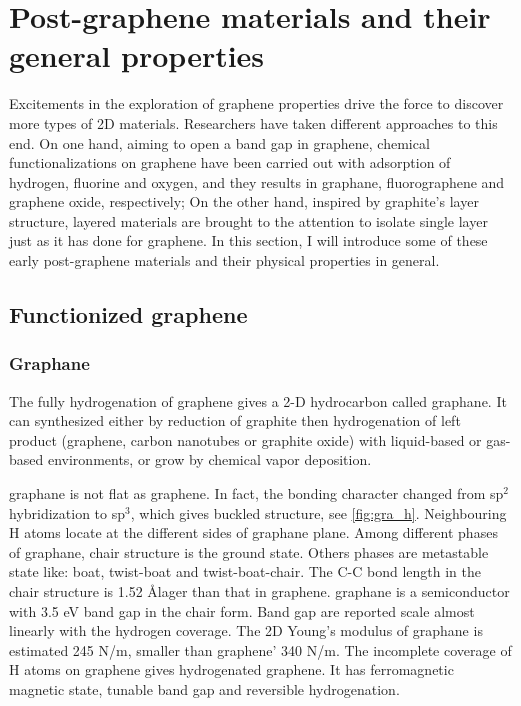 \section{Post-graphene materials and their general properties}

Excitements in the exploration of graphene properties drive the force to discover more types of 2D materials. Researchers have taken different approaches to this end. On one hand, aiming to open a band gap in graphene, chemical functionalizations on graphene have been carried out with adsorption of hydrogen, fluorine and oxygen, and they results in graphane, fluorographene and graphene oxide, respectively; On the other hand, inspired by graphite's layer structure, layered materials are brought to the attention to isolate single layer just as it has done for graphene. In this section, I will introduce some of these early post-graphene materials and their physical properties in general.

\subsection{Functionized graphene}

\subsubsection{Graphane}

The fully hydrogenation of graphene gives a 2-D hydrocarbon called graphane. It can synthesized either by reduction of graphite then hydrogenation of left product (graphene, carbon nanotubes or graphite oxide) with liquid-based\cite{Yang2012} or gas-based\cite{Burgess2011} environments, or grow by chemical vapor deposition\cite{wang2010}. 


graphane is not flat as graphene. In fact, the bonding character changed from sp$^2$ hybridization to sp$^3$, which gives buckled structure, see \autoref{fig:gra_h}. Neighbouring H atoms locate at the different sides of graphane plane. Among different phases of graphane, chair structure is the ground state. Others phases are metastable state like: boat, twist-boat and twist-boat-chair\cite{Samarakoon2009}. The C-C bond length in the chair structure is 1.52 \AA lager than that in graphene. graphane is a semiconductor with 3.5 eV band gap in the chair form. Band gap are reported scale almost linearly with the hydrogen coverage\cite{Ilyin2011}. The 2D Young's modulus of graphane is estimated 245 \si{N/m}\cite{Munoz2010}, smaller than graphene' 340 \si{N/m}. The incomplete coverage of H atoms on graphene gives hydrogenated graphene. It has ferromagnetic magnetic state\cite{Zhou2009}, tunable band gap\cite{Shkrebtii2011} and reversible hydrogenation\cite{Elias2009}. 

